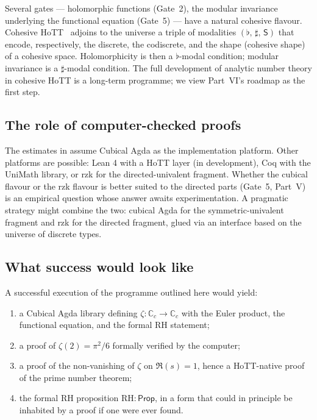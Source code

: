 \documentclass[12pt]{article}
\theoremstyle{definition}
\theoremstyle{remark}
\newcommand{\C}{\mathbb{C}}
\newcommand{\Cc}{\C_{c}}
\newcommand{\Prop}{\mathsf{Prop}}
\newcommand{\esh}{\mathsf{S}}
\begin{document}
Several gates --- holomorphic functions (Gate~2), the modular
invariance underlying the functional equation (Gate~5) --- have a
natural cohesive flavour. Cohesive HoTT~\cite{shulman-cohesive} adjoins
to the universe a triple of modalities $(\flat,\,\sharp,\,\esh)$
that encode, respectively, the discrete, the codiscrete, and the
shape (cohesive shape) of a cohesive space. Holomorphicity is then a
$\flat$-modal condition; modular invariance is a $\sharp$-modal
condition. The full development of analytic number theory in
cohesive HoTT is a long-term programme; we view Part~VI's roadmap as
the first step.

\subsection{The role of computer-checked proofs}

The estimates in  assume Cubical Agda as the
implementation platform. Other platforms are possible: Lean 4 with a
HoTT layer (in development), Coq with the UniMath library, or rzk
\cite{rzk} for the directed-univalent fragment. Whether the cubical
flavour or the rzk flavour is better suited to the directed parts
(Gate~5, Part~V) is an empirical question whose answer awaits
experimentation. A pragmatic strategy might combine the two: cubical
Agda for the symmetric-univalent fragment and rzk for the directed
fragment, glued via an interface based on the universe of discrete
types.

\subsection{What success would look like}

A successful execution of the programme outlined here would yield:
\begin{enumerate}[leftmargin=*]
\item a Cubical Agda library defining $\zeta : \Cc \to \Cc$ with the
      Euler product, the functional equation, and the formal RH
      statement;
\item a proof of $\zeta(2) = \pi^2/6$ formally verified by the
      computer;
\item a proof of the non-vanishing of $\zeta$ on $\Re(s) = 1$, hence
      a HoTT-native proof of the prime number theorem;
\item the formal RH proposition $\mathrm{RH} : \Prop$, in a form that
      could in principle be inhabited by a proof if one were ever
      found.
\end{enumerate}
\end{document}
